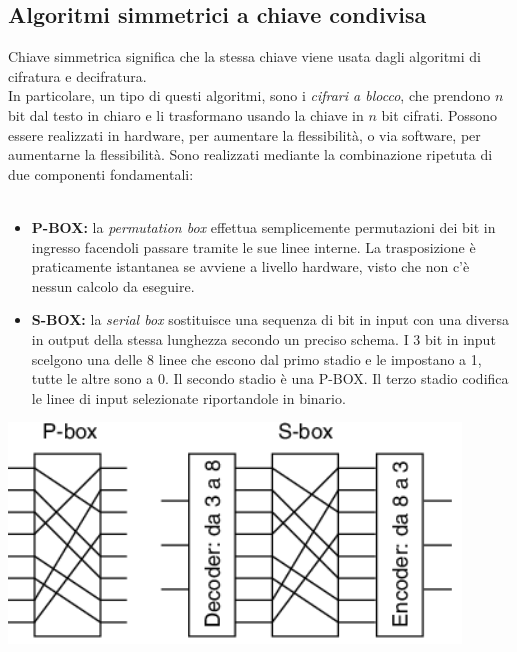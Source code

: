 \documentclass[10pt,a4paper,twoside]{article}
\begin{document}
\subsection{Algoritmi simmetrici a chiave condivisa}
Chiave simmetrica significa che la stessa chiave viene usata dagli algoritmi di cifratura e decifratura.\\
In particolare, un tipo di questi algoritmi, sono i \textit{cifrari a blocco}, che prendono $n$ bit dal testo in chiaro e li trasformano usando la chiave in $n$ bit cifrati. Possono essere realizzati in hardware, per aumentare la flessibilità, o via software, per aumentarne la flessibilità. Sono realizzati mediante la combinazione ripetuta di due componenti fondamentali:\\\\
\begin{minipage}{0.7\textwidth}
\begin{itemize}
\item \textbf{P-BOX:} la \textit{permutation box} effettua semplicemente permutazioni dei bit in ingresso facendoli passare tramite le sue linee interne. La trasposizione è praticamente istantanea se avviene a livello hardware, visto che non c'è nessun calcolo da eseguire.
\item \textbf{S-BOX:} la \textit{serial box} sostituisce una sequenza di bit in input con una diversa in output della stessa lunghezza secondo un preciso schema. I 3 bit in input scelgono una delle 8 linee che escono dal primo stadio e le impostano a 1, tutte le altre sono a 0. Il secondo stadio è una P-BOX. Il terzo stadio codifica le linee di input selezionate riportandole in binario.
\end{itemize}
\end{minipage}
\begin{minipage}{0.3\textwidth}
\begin{flushright}
\includegraphics[width=0.9\textwidth]{images/p-s-box.png}
\end{flushright}
\end{minipage}
\end{document}
